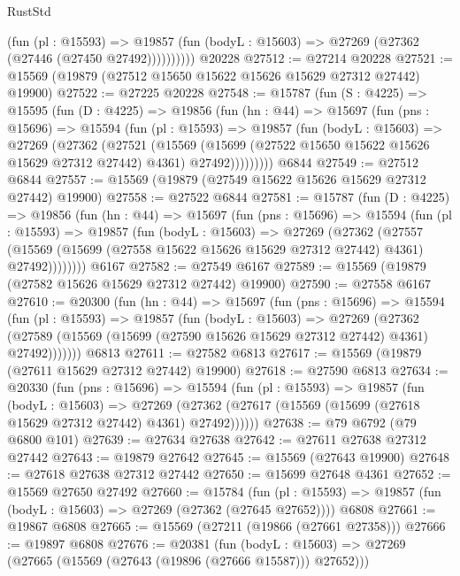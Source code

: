 \begin{lexlean}{RustStd}
\begin{coremodule}
              (fun (pl : @15593) =>
              @19857 (fun (bodyL : @15603) => @27269 (@27362 (@27446 (@27450 @27492))))))))))
    @20228
@27512 := @27214 @20228
@27521 := @15569 (@19879 (@27512 @15650 @15622 @15626 @15629 @27312 @27442) @19900)
@27522 := @27225 @20228
@27548 := @15787
    (fun (S : @4225) =>
    @15595
      (fun (D : @4225) =>
      @19856
        (fun (hn : @44) =>
        @15697
          (fun (pns : @15696) =>
          @15594
            (fun (pl : @15593) =>
            @19857
              (fun (bodyL : @15603) =>
              @27269
                (@27362
                  (@27521
                    (@15569
                      (@15699 (@27522 @15650 @15622 @15626 @15629 @27312 @27442) @4361)
                      @27492)))))))))
    @6844
@27549 := @27512 @6844
@27557 := @15569 (@19879 (@27549 @15622 @15626 @15629 @27312 @27442) @19900)
@27558 := @27522 @6844
@27581 := @15787
    (fun (D : @4225) =>
    @19856
      (fun (hn : @44) =>
      @15697
        (fun (pns : @15696) =>
        @15594
          (fun (pl : @15593) =>
          @19857
            (fun (bodyL : @15603) =>
            @27269
              (@27362
                (@27557
                  (@15569 (@15699 (@27558 @15622 @15626 @15629 @27312 @27442) @4361) @27492))))))))
    @6167
@27582 := @27549 @6167
@27589 := @15569 (@19879 (@27582 @15626 @15629 @27312 @27442) @19900)
@27590 := @27558 @6167
@27610 := @20300
    (fun (hn : @44) =>
    @15697
      (fun (pns : @15696) =>
      @15594
        (fun (pl : @15593) =>
        @19857
          (fun (bodyL : @15603) =>
          @27269
            (@27362
              (@27589 (@15569 (@15699 (@27590 @15626 @15629 @27312 @27442) @4361) @27492)))))))
    @6813
@27611 := @27582 @6813
@27617 := @15569 (@19879 (@27611 @15629 @27312 @27442) @19900)
@27618 := @27590 @6813
@27634 := @20330
    (fun (pns : @15696) =>
    @15594
      (fun (pl : @15593) =>
      @19857
        (fun (bodyL : @15603) =>
        @27269 (@27362 (@27617 (@15569 (@15699 (@27618 @15629 @27312 @27442) @4361) @27492))))))
@27638 := @79 @6792 (@79 @6800 @101)
@27639 := @27634 @27638
@27642 := @27611 @27638 @27312 @27442
@27643 := @19879 @27642
@27645 := @15569 (@27643 @19900)
@27648 := @27618 @27638 @27312 @27442
@27650 := @15699 @27648 @4361
@27652 := @15569 @27650 @27492
@27660 := @15784
    (fun (pl : @15593) => @19857 (fun (bodyL : @15603) => @27269 (@27362 (@27645 @27652))))
    @6808
@27661 := @19867 @6808
@27665 := @15569 (@27211 (@19866 (@27661 @27358)))
@27666 := @19897 @6808
@27676 := @20381
    (fun (bodyL : @15603) => @27269 (@27665 (@15569 (@27643 (@19896 (@27666 @15587))) @27652)))

\end{coremodule}
\end{lexlean}

